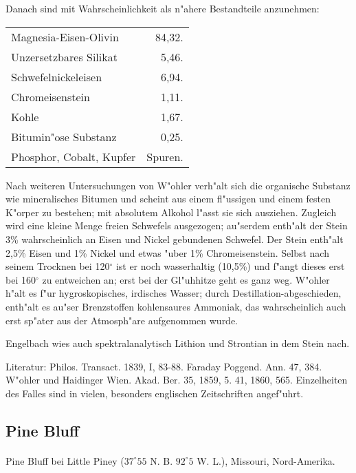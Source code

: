 \documentclass[a4paper, 11pt, oneside]{article}
\begin{document}
Danach sind mit Wahrscheinlichkeit als n"ahere Bestandteile anzunehmen:

\begin{table}[!ht]
    \centering
    \begin{tabular}{l r}
        Magnesia-Eisen-Olivin & 84,32. \\
        Unzersetzbares Silikat  & 5,46. \\
        Schwefelnickeleisen & 6,94. \\
        Chromeisenstein & 1,11. \\
        Kohle & 1,67. \\
        Bitumin"ose Substanz & 0,25. \\
        Phosphor, Cobalt, Kupfer  & Spuren. \\
    \end{tabular}
\end{table}

Nach weiteren Untersuchungen von W"ohler verh"alt sich die organische Substanz wie mineralisches Bitumen und scheint aus einem fl"ussigen und einem festen K"orper zu bestehen; mit absolutem Alkohol l"asst sie sich ausziehen. Zugleich wird eine kleine Menge freien Schwefels ausgezogen; au"serdem enth"alt der Stein 3\% wahrscheinlich an Eisen und Nickel gebundenen Schwefel. Der Stein enth"alt 2,5\% Eisen und 1\% Nickel und etwas "uber 1\% Chromeisenstein. Selbst nach seinem Trocknen bei 120$^\circ$ ist er noch wasserhaltig (10,5\%) und f"angt dieses erst bei 160$^\circ$ zu entweichen an; erst bei der Gl"uhhitze geht es ganz weg. W"ohler h"alt es f"ur hygroskopisches, irdisches Wasser; durch Destillation-abgeschieden‚ enth"alt es au"ser Brenzstoffen kohlensaures Ammoniak, das wahrscheinlich auch erst sp"ater aus der Atmosph"are aufgenommen wurde.

Engelbach wies auch spektralanalytisch Lithion und Strontian in dem Stein nach.

\footnotesize
Literatur: Philos. Transact. 1839, I, 83-88. Faraday Poggend. Ann. 47, 384. W"ohler und Haidinger Wien. Akad. Ber. 35, 1859, 5. 41, 1860, 565. Einzelheiten des Falles sind in vielen, besonders englischen Zeitschriften angef"uhrt.

\subsection{Pine Bluff}
\normalsize
\paragraph{}
Pine Bluff bei Little Piney ($37^\circ 55$ N. B. $92^\circ 5$ W. L.), Missouri, Nord-Amerika.
\end{document}
